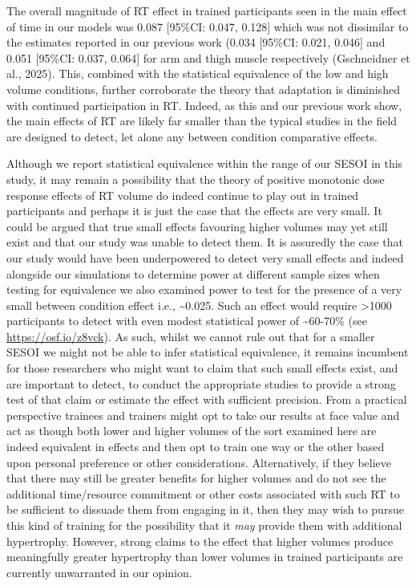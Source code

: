 \documentclass[
]{article}
\begin{document}
The overall magnitude of RT effect in trained participants seen in the
main effect of time in our models was 0.087 {[}95\%CI: 0.047, 0.128{]}
which was not dissimilar to the estimates reported in our previous work
(0.034 {[}95\%CI: 0.021, 0.046{]} and 0.051 {[}95\%CI: 0.037, 0.064{]}
for arm and thigh muscle respectively (Gschneidner et al., 2025). This,
combined with the statistical equivalence of the low and high volume
conditions, further corroborate the theory that adaptation is diminished
with continued participation in RT. Indeed, as this and our previous
work show, the main effects of RT are likely far smaller than the
typical studies in the field are designed to detect, let alone any
between condition comparative effects.

Although we report statistical equivalence within the range of our SESOI
in this study, it may remain a possibility that the theory of positive
monotonic dose response effects of RT volume do indeed continue to play
out in trained participants and perhaps it is just the case that the
effects are very small. It could be argued that true small effects
favouring higher volumes may yet still exist and that our study was
unable to detect them. It is assuredly the case that our study would
have been underpowered to detect very small effects and indeed alongside
our simulations to determine power at different sample sizes when
testing for equivalence we also examined power to test for the presence
of a very small between condition effect i.e., \textasciitilde0.025.
Such an effect would require \textgreater1000 participants to detect
with even modest statistical power of \textasciitilde60-70\% (see
\url{https://osf.io/z8vck}). As such, whilst we cannot rule out that for
a smaller SESOI we might not be able to infer statistical equivalence,
it remains incumbent for those researchers who might want to claim that
such small effects exist, and are important to detect, to conduct the
appropriate studies to provide a strong test of that claim or estimate
the effect with sufficient precision. From a practical perspective
trainees and trainers might opt to take our results at face value and
act as though both lower and higher volumes of the sort examined here
are indeed equivalent in effects and then opt to train one way or the
other based upon personal preference or other considerations.
Alternatively, if they believe that there may still be greater benefits
for higher volumes and do not see the additional time/resource
commitment or other costs associated with such RT to be sufficient to
dissuade them from engaging in it, then they may wish to pursue this
kind of training for the possibility that it \emph{may} provide them
with additional hypertrophy. However, strong claims to the effect that
higher volumes produce meaningfully greater hypertrophy than lower
volumes in trained participants are currently unwarranted in our
opinion.
\end{document}
